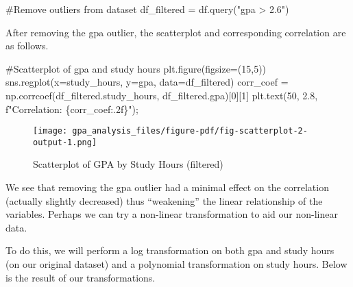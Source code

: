 \documentclass[
  letterpaper,
  DIV=11,
  numbers=noendperiod]{scrreprt}
\newenvironment{Shaded}{\begin{snugshade}}{\end{snugshade}}
\newcommand{\CommentTok}[1]{\textcolor[rgb]{0.37,0.37,0.37}{#1}}
\newcommand{\DecValTok}[1]{\textcolor[rgb]{0.68,0.00,0.00}{#1}}
\newcommand{\FloatTok}[1]{\textcolor[rgb]{0.68,0.00,0.00}{#1}}
\newcommand{\NormalTok}[1]{\textcolor[rgb]{0.00,0.23,0.31}{#1}}
\newcommand{\OperatorTok}[1]{\textcolor[rgb]{0.37,0.37,0.37}{#1}}
\newcommand{\SpecialCharTok}[1]{\textcolor[rgb]{0.37,0.37,0.37}{#1}}
\newcommand{\SpecialStringTok}[1]{\textcolor[rgb]{0.13,0.47,0.30}{#1}}
\newcommand{\StringTok}[1]{\textcolor[rgb]{0.13,0.47,0.30}{#1}}
\begin{document}
\begin{Shaded}
\begin{Highlighting}[]
\CommentTok{\#Remove outliers from dataset}
\NormalTok{df\_filtered }\OperatorTok{=}\NormalTok{ df.query(}\StringTok{"gpa \textgreater{} 2.6"}\NormalTok{)}
\end{Highlighting}
\end{Shaded}

After removing the gpa outlier, the scatterplot and corresponding
correlation are as follows.

\begin{Shaded}
\begin{Highlighting}[]
\CommentTok{\#Scatterplot of gpa and study hours}
\NormalTok{plt.figure(figsize}\OperatorTok{=}\NormalTok{(}\DecValTok{15}\NormalTok{,}\DecValTok{5}\NormalTok{))}
\NormalTok{sns.regplot(x}\OperatorTok{=}\StringTok{\textquotesingle{}study\_hours\textquotesingle{}}\NormalTok{, y}\OperatorTok{=}\StringTok{\textquotesingle{}gpa\textquotesingle{}}\NormalTok{, data}\OperatorTok{=}\NormalTok{df\_filtered)}
\NormalTok{corr\_coef }\OperatorTok{=}\NormalTok{ np.corrcoef(df\_filtered.study\_hours, df\_filtered.gpa)[}\DecValTok{0}\NormalTok{][}\DecValTok{1}\NormalTok{]}
\NormalTok{plt.text(}\DecValTok{50}\NormalTok{, }\FloatTok{2.8}\NormalTok{, }\SpecialStringTok{f"Correlation: }\SpecialCharTok{\{}\NormalTok{corr\_coef}\SpecialCharTok{:.2f\}}\SpecialStringTok{"}\NormalTok{)}\OperatorTok{;}
\end{Highlighting}
\end{Shaded}

\begin{figure}[H]

{\centering \texttt{[image: gpa\_analysis\_files/figure-pdf/fig-scatterplot-2-output-1.png]}

}

\caption{\label{fig-scatterplot-2}Scatterplot of GPA by Study Hours
(filtered)}

\end{figure}

We see that removing the gpa outlier had a minimal effect on the
correlation (actually slightly decreased) thus ``weakening'' the linear
relationship of the variables. Perhaps we can try a non-linear
transformation to aid our non-linear data.

To do this, we will perform a log transformation on both gpa and study
hours (on our original dataset) and a polynomial transformation on study
hours. Below is the result of our transformations.
\end{document}
